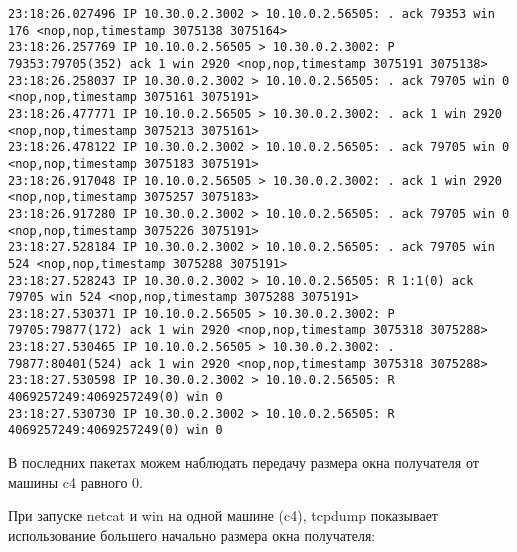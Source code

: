 \documentclass[a4paper,12pt]{article}
\begin{document}
\begin{Verbatim}
23:18:26.027496 IP 10.30.0.2.3002 > 10.10.0.2.56505: . ack 79353 win 176 <nop,nop,timestamp 3075138 3075164>
23:18:26.257769 IP 10.10.0.2.56505 > 10.30.0.2.3002: P 79353:79705(352) ack 1 win 2920 <nop,nop,timestamp 3075191 3075138>
23:18:26.258037 IP 10.30.0.2.3002 > 10.10.0.2.56505: . ack 79705 win 0 <nop,nop,timestamp 3075161 3075191>
23:18:26.477771 IP 10.10.0.2.56505 > 10.30.0.2.3002: . ack 1 win 2920 <nop,nop,timestamp 3075213 3075161>
23:18:26.478122 IP 10.30.0.2.3002 > 10.10.0.2.56505: . ack 79705 win 0 <nop,nop,timestamp 3075183 3075191>
23:18:26.917048 IP 10.10.0.2.56505 > 10.30.0.2.3002: . ack 1 win 2920 <nop,nop,timestamp 3075257 3075183>
23:18:26.917280 IP 10.30.0.2.3002 > 10.10.0.2.56505: . ack 79705 win 0 <nop,nop,timestamp 3075226 3075191>
23:18:27.528184 IP 10.30.0.2.3002 > 10.10.0.2.56505: . ack 79705 win 524 <nop,nop,timestamp 3075288 3075191>
23:18:27.528243 IP 10.30.0.2.3002 > 10.10.0.2.56505: R 1:1(0) ack 79705 win 524 <nop,nop,timestamp 3075288 3075191>
23:18:27.530371 IP 10.10.0.2.56505 > 10.30.0.2.3002: P 79705:79877(172) ack 1 win 2920 <nop,nop,timestamp 3075318 3075288>
23:18:27.530465 IP 10.10.0.2.56505 > 10.30.0.2.3002: . 79877:80401(524) ack 1 win 2920 <nop,nop,timestamp 3075318 3075288>
23:18:27.530598 IP 10.30.0.2.3002 > 10.10.0.2.56505: R 4069257249:4069257249(0) win 0
23:18:27.530730 IP 10.30.0.2.3002 > 10.10.0.2.56505: R 4069257249:4069257249(0) win 0

\end{Verbatim}

В последних пакетах можем наблюдать передачу размера окна получателя от машины c4 равного 0.

При запуске netcat и win на одной машине (c4), tcpdump показывает использование большего начально размера окна получателя:
\end{document}
